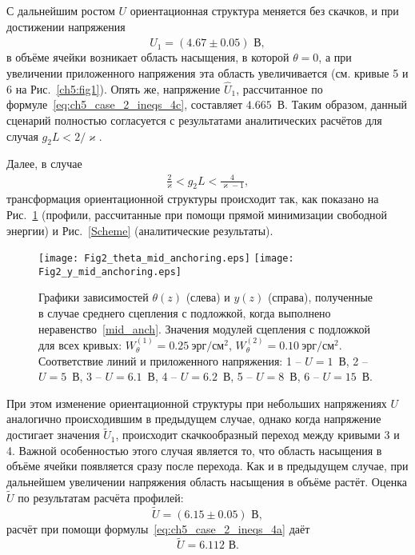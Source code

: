 С дальнейшим ростом $U$ ориентационная структура меняется без скачков, и при достижении напряжения
\begin{equation}
	\hat{U}_1 = (4.67\pm 0.05)\text{~В},
\end{equation}
в объёме ячейки возникает область насыщения, в которой $\theta = 0$, а при увеличении приложенного напряжения эта область увеличивается (см. кривые 5 и 6 на Рис.~\ref{ch5:fig1}).
Опять же, напряжение $\hat{U}_1$, рассчитанное по формуле~\eqref{eq:ch5_case_2_ineqs_4c}, составляет $4.665$~В.
Таким образом, данный сценарий полностью согласуется с результатами аналитических расчётов для случая $g_2 L < 2/\varkappa$.

Далее, в случае
\begin{align}\label{mid_anch}
	\frac{2}{\varkappa}< g_2L < \frac{4}{\varkappa - 1},
\end{align}
трансформация ориентационной структуры происходит так, как показано на Рис.~\ref{ch5:fig2} (профили, рассчитанные при помощи прямой минимизации свободной энергии) и Рис.~\ref{Scheme} (аналитические результаты).
\begin{figure}[h]
	\texttt{[image: Fig2\_theta\_mid\_anchoring.eps]}\hspace{2pc}%
	\texttt{[image: Fig2\_y\_mid\_anchoring.eps]}
	\caption{Графики зависимостей $\theta(z)$ (слева) и $y(z)$ (справа), полученные в случае среднего сцепления с подложкой, когда выполнено неравенство~\eqref{mid_anch}.
		Значения модулей сцепления с подложкой для всех кривых: $W_\theta^{(1)}=0.25\ \text{эрг}/\text{см}^2$, $W_\theta^{(2)} = 0.10\ \text{эрг}/\text{см}^2$.
		Соответствие линий и приложенного напряжения: 1 -- $U = 1$~В, 2 -- $U = 5$~В, 3 -- $U = 6.1$~В, 4 -- $U = 6.2$~В, 5 -- $U = 8$~В, 6 -- $U = 15$~В.}\label{ch5:fig2}
\end{figure}
При этом изменение ориентационной структуры при небольших напряжениях $U$ аналогично происходившим в предыдущем случае, однако когда напряжение достигает значения $\widetilde{U}_1$, происходит скачкообразный переход между кривыми 3 и 4.
Важной особенностью этого случая является то, что область насыщения в объёме ячейки появляется сразу после перехода.
Как и в предыдущем случае, при дальнейшем увеличении напряжения область насыщения в объёме растёт.
Оценка $\tilde{U}$ по результатам расчёта профилей:
\begin{equation}
	\tilde{U} = (6.15\pm 0.05)\text{~В},
\end{equation}
расчёт при помощи формулы~\eqref{eq:ch5_case_2_ineqs_4a} даёт
\begin{equation}
	\tilde{U} = 6.112\text{~В}.
\end{equation}


